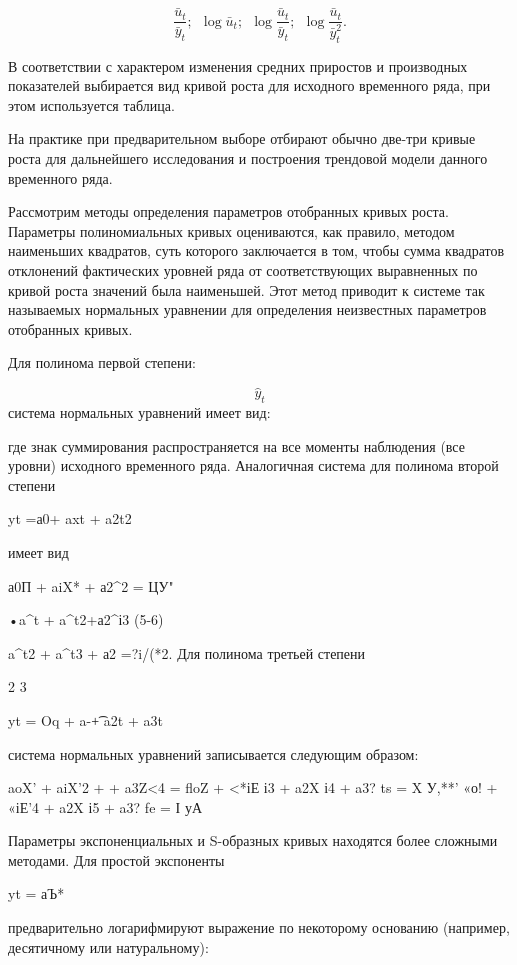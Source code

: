 \[ \frac{\bar{u}_t}{\bar{y}_t};\ \ \log \bar{u}_t;\ \ \log \dfrac{\bar{u}_t}{\bar{y}_t};\ \ \log \dfrac{\bar{u}_t}{\bar{y}_t^2}. \]

В соответствии с характером изменения средних приростов и производных показателей выбирается вид кривой роста для исходного временного ряда, при этом используется таблица.





На практике при предварительном выборе отбирают обычно две-три кривые роста для дальнейшего исследования и построения трендовой модели данного временного ряда.

Рассмотрим методы определения параметров отобранных кривых роста. Параметры полиномиальных кривых оцениваются, как правило, методом наименьших квадратов, суть которого заключается в том, чтобы сумма квадратов отклонений фактических уровней ряда от соответствующих выравненных по кривой роста значений была наименьшей. Этот метод приводит к системе так называемых нормальных уравнении для определения неизвестных параметров отобранных кривых.

Для полинома первой степени:

\[ \hat{y}_t \]
система нормальных уравнений имеет вид:

\systeme{}

где знак суммирования распространяется на все моменты наблюдения (все уровни) исходного временного ряда. Аналогичная система для полинома второй степени

yt =а0+ axt + a2t2

имеет вид

а0П + aiX* + а2^2 = ЦУ"

•a^t + a^t2+а2^і3	(5-6)

a^t2 + a^t3 + а2 =?i/(*2. Для полинома третьей степени

2	3

yt = Oq + a-\t + a2t + a3t

система нормальных уравнений записывается следующим образом:

aoX' + aiX'2 + + a3Z<4 = floZ + <*іЕ і3 + a2X і4 + a3? ts = X У,**' «о! + «іЕ'4 + a2X і5 + a3? fe = І уА

Параметры экспоненциальных и S-образных кривых находятся более сложными методами. Для простой экспоненты

yt = аЪ*

предварительно логарифмируют выражение по некоторому основанию (например, десятичному или натуральному):

